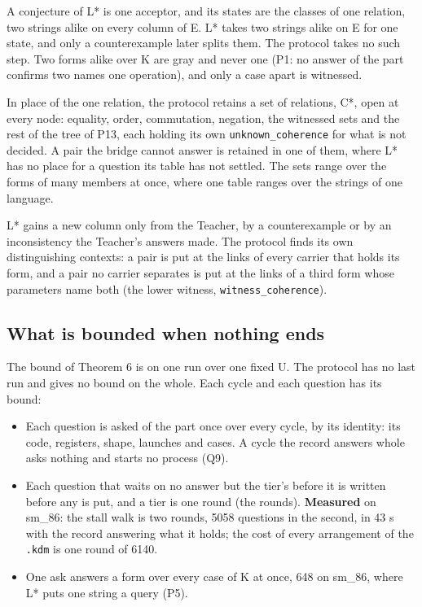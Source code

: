 A conjecture of L* is one acceptor, and its states are the classes of one relation, two strings alike on every column of E. L* takes two strings alike on E for one state, and only a counterexample later splits them. The protocol takes no such step. Two forms alike over K are gray and never one (P1: no answer of the part confirms two names one operation), and only a case apart is witnessed.

In place of the one relation, the protocol retains a set of relations, C*, open at every node: equality, order, commutation, negation, the witnessed sets and the rest of the tree of P13, each holding its own \texttt{unknown\_\allowbreak{}coherence} for what is not decided. A pair the bridge cannot answer is retained in one of them, where L* has no place for a question its table has not settled. The sets range over the forms of many members at once, where one table ranges over the strings of one language.

L* gains a new column only from the Teacher, by a counterexample or by an inconsistency the Teacher's answers made. The protocol finds its own distinguishing contexts: a pair is put at the links of every carrier that holds its form, and a pair no carrier separates is put at the links of a third form whose parameters name both (the lower witness, \texttt{witness\_\allowbreak{}coherence}).

\subsection{\texorpdfstring{What is bounded when nothing ends}{What is bounded when nothing ends}}

The bound of Theorem 6 is on one run over one fixed U. The protocol has no last run and gives no bound on the whole. Each cycle and each question has its bound:

\begin{itemize}
\item Each question is asked of the part once over every cycle, by its identity: its code, registers, shape, launches and cases. A cycle the record answers whole asks nothing and starts no process (Q9).
\item Each question that waits on no answer but the tier's before it is written before any is put, and a tier is one round (the rounds). \textbf{Measured} on sm\_\allowbreak{}86: the stall walk is two rounds, 5058 questions in the second, in 43 s with the record answering what it holds; the cost of every arrangement of the \texttt{.\allowbreak{}kdm} is one round of 6140.
\item One ask answers a form over every case of K at once, 648 on sm\_\allowbreak{}86, where L* puts one string a query (P5).
\end{itemize}

